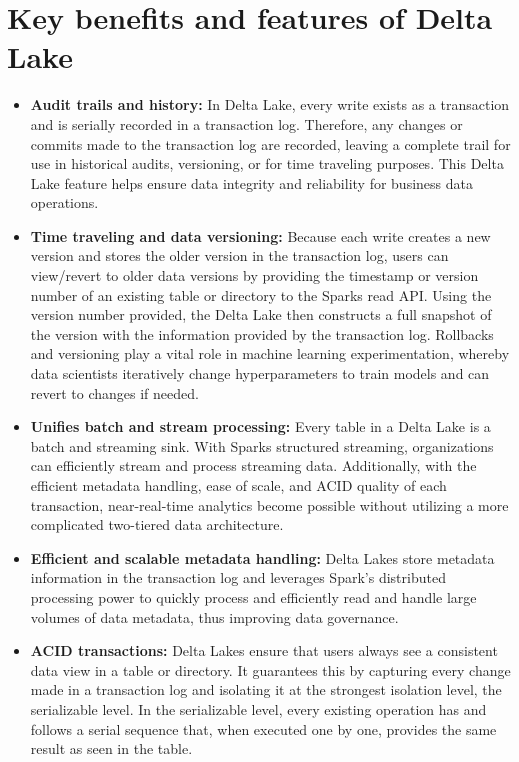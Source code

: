 \section{Key benefits and features of Delta Lake}
\begin{itemize}
    \item[\textbullet] \textbf{Audit trails and history:} In Delta Lake, every write exists as a transaction and is serially recorded in a transaction log. Therefore, any changes or commits made to the transaction log are recorded, leaving a complete trail for use in historical audits, versioning, or for time traveling purposes. This Delta Lake feature helps ensure data integrity and reliability for business data operations.
    \item[\textbullet] \textbf{Time traveling and data versioning:} Because each write creates a new version and stores the older version in the transaction log, users can view/revert to older data versions by providing the timestamp or version number of an existing table or directory to the Sparks read API\@. Using the version number provided, the Delta Lake then constructs a full snapshot of the version with the information provided by the transaction log. Rollbacks and versioning play a vital role in machine learning experimentation, whereby data scientists iteratively change hyperparameters to train models and can revert to changes if needed.
    \item[\textbullet] \textbf{Unifies batch and stream processing:} Every table in a Delta Lake is a batch and streaming sink. With Sparks structured streaming, organizations can efficiently stream and process streaming data. Additionally, with the efficient metadata handling, ease of scale, and ACID quality of each transaction, near-real-time analytics become possible without utilizing a more complicated two-tiered data architecture.
    \item[\textbullet] \textbf{Efficient and scalable metadata handling:} Delta Lakes store metadata information in the transaction log and leverages Spark's distributed processing power to quickly process and efficiently read and handle large volumes of data metadata, thus improving data governance.
    \item[\textbullet] \textbf{ACID transactions:} Delta Lakes ensure that users always see a consistent data view in a table or directory. It guarantees this by capturing every change made in a transaction log and isolating it at the strongest isolation level, the serializable level. In the serializable level, every existing operation has and follows a serial sequence that, when executed one by one, provides the same result as seen in the table.

\end{itemize}
